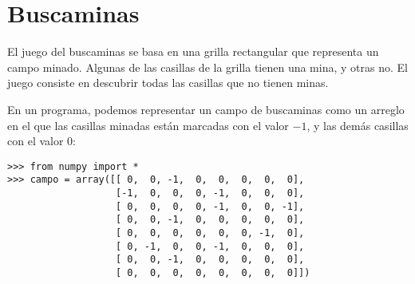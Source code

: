 \section{Buscaminas}

El juego del buscaminas se basa en una grilla rectangular que representa
un campo minado. Algunas de las casillas de la grilla tienen una mina, y
otras no. El juego consiste en descubrir todas las casillas que no
tienen minas.

En un programa, podemos representar un campo de buscaminas como un
arreglo en el que las casillas minadas están marcadas con el valor \(-1\), y
las demás casillas con el valor 0:

\begin{lstlisting}
>>> from numpy import *
>>> campo = array([[ 0,  0, -1,  0,  0,  0,  0,  0],
                   [-1,  0,  0,  0, -1,  0,  0,  0],
                   [ 0,  0,  0,  0, -1,  0,  0, -1],
                   [ 0,  0, -1,  0,  0,  0,  0,  0],
                   [ 0,  0,  0,  0,  0,  0, -1,  0],
                   [ 0, -1,  0,  0, -1,  0,  0,  0],
                   [ 0,  0, -1,  0,  0,  0,  0,  0],
                   [ 0,  0,  0,  0,  0,  0,  0,  0]])
\end{lstlisting}

